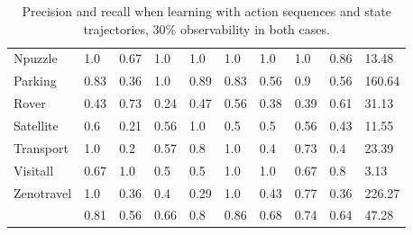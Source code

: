 \begin{table}[hbt!]
\begin{center}
\begin{footnotesize}
\begin{tabular}{l|l|l|l|l|l|l||l|l||l|}
			Npuzzle & 1.0 & 0.67 & 1.0 & 1.0 & 1.0 & 1.0 & 1.0 & 0.86& 13.48 \\ %
			Parking & 0.83 & 0.36 & 1.0 & 0.89 & 0.83 & 0.56 & 0.9 & 0.56& 160.64 \\ %
			Rover & 0.43 & 0.73 & 0.24 & 0.47 & 0.56 & 0.38 & 0.39 & 0.61& 31.13 \\ %
			Satellite & 0.6 & 0.21 & 0.56 & 1.0 & 0.5 & 0.5 & 0.56 & 0.43& 11.55 \\ %
			Transport & 1.0 & 0.2 & 0.57 & 0.8 & 1.0 & 0.4 & 0.73 & 0.4& 23.39 \\ %
			Visitall & 0.67 & 1.0 & 0.5 & 0.5 & 1.0 & 1.0 & 0.67 & 0.8& 3.13 \\ %
			Zenotravel & 1.0 & 0.36 & 0.4 & 0.29 & 1.0 & 0.43 & 0.77 & 0.36& 226.27 \\ %
			\hline
			\bf & 0.81 & 0.56 & 0.66 & 0.8 & 0.86 & 0.68 & 0.74 & 0.64 & 47.28
			
		\end{tabular}
		\end{footnotesize}
	\end{center}
	\caption{\small Precision and recall when learning with \PO action sequences and \PO state trajectories, 30\% observability in both cases.}
	\label{tab:results_minimum_30_30}
\end{table}


